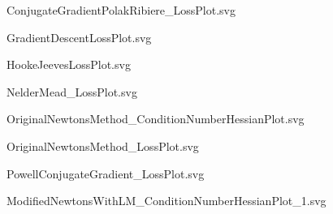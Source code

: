 \documentclass{article}
\begin{document}
    \begin{figure}[H]
        \centering
        
        \caption{ConjugateGradientPolakRibiere_LossPlot.svg}
        \label{fig:ConjugateGradientPolakRibiere_LossPlot.svg}
    \end{figure}
    
    \begin{figure}[H]
        \centering
        
        \caption{GradientDescentLossPlot.svg}
        \label{fig:GradientDescentLossPlot.svg}
    \end{figure}
    
    \begin{figure}[H]
        \centering
        
        \caption{HookeJeevesLossPlot.svg}
        \label{fig:HookeJeevesLossPlot.svg}
    \end{figure}
    
    \begin{figure}[H]
        \centering
        
        \caption{NelderMead_LossPlot.svg}
        \label{fig:NelderMead_LossPlot.svg}
    \end{figure}
    
    \begin{figure}[H]
        \centering
        
        \caption{OriginalNewtonsMethod_ConditionNumberHessianPlot.svg}
        \label{fig:OriginalNewtonsMethod_ConditionNumberHessianPlot.svg}
    \end{figure}
    
    \begin{figure}[H]
        \centering
        
        \caption{OriginalNewtonsMethod_LossPlot.svg}
        \label{fig:OriginalNewtonsMethod_LossPlot.svg}
    \end{figure}
    
    \begin{figure}[H]
        \centering
        
        \caption{PowellConjugateGradient_LossPlot.svg}
        \label{fig:PowellConjugateGradient_LossPlot.svg}
    \end{figure}
    
    \begin{figure}[H]
        \centering
        
        \caption{ModifiedNewtonsWithLM_ConditionNumberHessianPlot_1.svg}
        \label{fig:ModifiedNewtonsWithLM_ConditionNumberHessianPlot_1.svg}
    \end{figure}
    
\end{document}
